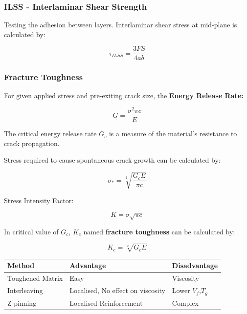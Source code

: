 \documentclass{NoteThesis/note-thesis}
\begin{document}
\subsubsection*{ILSS - Interlaminar Shear Strength}

Testing the adhesion between layers. Interlaminar shear stress at mid-plane is calculated by:

\begin{equation*}
    \tau_{ILSS} = \frac{3FS}{4ab}
\end{equation*}

\subsubsection*{Fracture Toughness}

For given applied stress and pre-exiting crack size, the \textbf{Energy Release Rate:}

\begin{equation*}
    G=\frac{\sigma^2 \pi c}{E}
\end{equation*}

The critical energy release rate $G_c$ is a measure of the material's resistance to crack propagation.

Stress required to cause spontaneous crack growth can be calculated by:

\begin{equation*}
    \sigma_{*} = \sqrt[2]{\frac{G_c E}{\pi c}}
\end{equation*}

Stress Intensity Factor:

\begin{equation*}
    K = \sigma \sqrt{\pi c}
\end{equation*}

In critical value of $G_c$, $K_c$ named \textbf{fracture toughness} can be calculated by:

\begin{equation*}
    K_c = \sqrt[2]{G_c E}
\end{equation*}

\begin{table}[h]
    \centering
    \begin{tabular}{lll}
        \hline
        Method & Advantage & Disadvantage \\
        \hline
        Toughened Matrix & Easy & Viscosity\\
        Interleaving & Localised, No effect on viscosity & Lower $V_f$,$T_g$\\
        Z-pinning & Localised Reinforcement & Complex\\
        \hline
    \end{tabular}
\end{table}
\end{document}
